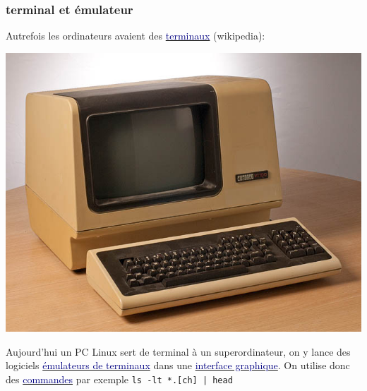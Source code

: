 \documentclass[lualatex,11pt,a4paper,svgnames,french]{beamer}
\newcommand{\clbhref}[2]{{\href{https:#1}{{\textcolor{Navy}{#2}}}}}
\begin{document}
\begin{frame}\frametitle{terminal et émulateur}
  Autrefois les ordinateurs avaient des \clbhref{https://fr.wikipedia.org/wiki/Terminal_(informatique)}{terminaux} (wikipedia):
  \begin{center}
  \includegraphics[height=0.33\textheight]{Terminal-dec-vt100}
  \end{center}
  \bigskip
  
  Aujourd'hui un PC Linux sert de terminal à un superordinateur, on y
  lance des logiciels
  \clbhref{https://fr.wikipedia.org/wiki/émulateur_de_terminal}{émulateurs
    de terminaux} dans une
  \clbhref{https://fr.wikipedia.org/wiki/Interface_graphique}{interface
    graphique}. On utilise donc des \clbhref{https://fr.wikipedia.org/wiki/Commandes_Unix}{commandes} par exemple \texttt{ls -lt *.[ch] | head}
\end{frame}
\end{document}

